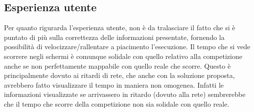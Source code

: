 \subsection{Esperienza utente}
Per quanto rigurarda l’esperienza utente, non è da tralasciare il fatto che si è puntato di più sulla correttezza delle informazioni presentate, fornendo la possibilità di velocizzare/rallentare a piacimento l’esecuzione. Il tempo che si vede scorrere negli schermi è comunque solidale con quello relativo alla competizione anche se non perfettamente mappabile con quello reale che scorre. Questo è principalmente dovuto ai ritardi di rete, che anche con la soluzione proposta, avrebbero fatto visualizzare il tempo in maniera non omogenea. Infatti le informazioni visualizzate se arrivassero in ritardo (dovuto alla rete) sembrerebbe che il tempo che scorre della competizione non sia solidale con quello reale.